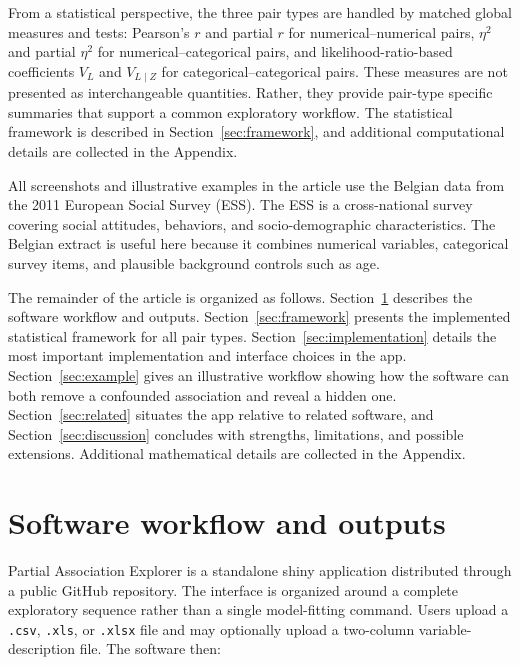 \documentclass[11pt]{article}
\newcommand{\appname}{Partial Association Explorer}
\newcommand{\code}[1]{\texttt{#1}}
\newcommand{\pkg}[1]{\textsf{#1}}
\begin{document}
From a statistical perspective, the three pair types are handled by matched
global measures and tests: Pearson's $r$ and partial $r$ for
numerical--numerical pairs, $\eta^2$ and partial $\eta^2$ for
numerical--categorical pairs, and likelihood-ratio-based coefficients $V_L$
and $V_{L\mid Z}$ for categorical--categorical pairs. These measures are not
presented as interchangeable quantities. Rather, they provide pair-type
specific summaries that support a common exploratory workflow. The statistical
framework is described in Section~\ref{sec:framework}, and additional
computational details are collected in the Appendix.

All screenshots and illustrative examples in the article use the Belgian data
from the 2011 European Social Survey (ESS). The ESS is a cross-national survey
covering social attitudes, behaviors, and socio-demographic characteristics.
The Belgian extract is useful here because it combines numerical variables,
categorical survey items, and plausible background controls such as age.

The remainder of the article is organized as follows. Section~\ref{sec:overview}
describes the software workflow and outputs. Section~\ref{sec:framework}
presents the implemented statistical framework for all pair types.
Section~\ref{sec:implementation} details the most important implementation and
interface choices in the app. Section~\ref{sec:example} gives an illustrative
workflow showing how the software can both remove a confounded association and
reveal a hidden one. Section~\ref{sec:related} situates the app relative to
related software, and Section~\ref{sec:discussion} concludes with strengths,
limitations, and possible extensions. Additional mathematical details are
collected in the Appendix.

\section{Software workflow and outputs}
\label{sec:overview}

\appname{} is a standalone \pkg{shiny} application distributed through a public
GitHub repository. The interface is organized around a complete exploratory
sequence rather than a single model-fitting command. Users upload a
\code{.csv}, \code{.xls}, or \code{.xlsx} file and may optionally upload a
two-column variable-description file. The software then:
\end{document}
